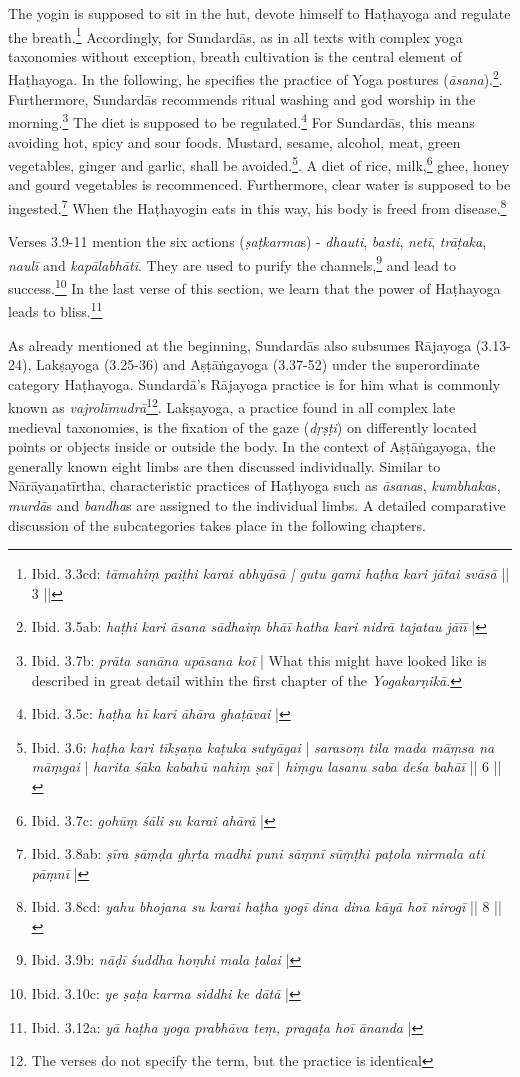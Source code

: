 The yogin is supposed to sit in the hut, devote himself to Haṭhayoga and regulate the breath.\footnote{Ibid. 3.3cd: \textit{tāmahiṃ paiṭhi karai abhyāsā | gutu gami haṭha kari jātai svāsā} || 3 ||} Accordingly, for Sundardās, as in all texts with complex yoga taxonomies without exception, breath cultivation is the central element of Haṭhayoga. In the following, he specifies the practice of Yoga postures (\textit{āsana}).\footnote{Ibid. 3.5ab: \textit{haṭhi kari āsana sādhaiṃ bhāī} \textit{hatha kari nidrā tajatau jāīī} |}. Furthermore, Sundardās recommends ritual washing and god worship in the morning.\footnote{Ibid. 3.7b: \textit{prāta sanāna upāsana koī} | What this might have looked like is described in great detail within the first chapter of the \textit{Yogakarṇikā}.} The diet is supposed to be regulated.\footnote{Ibid. 3.5c: \textit{haṭha hī kari āhāra ghaṭāvai} |} For Sundardās, this means avoiding hot, spicy and sour foods. Mustard, sesame, alcohol, meat, green vegetables, ginger and garlic, shall be avoided.\footnote{Ibid. 3.6: \textit{haṭha kari tīkṣaṇa kaṭuka sutyāgai} | \textit{sarasoṃ tila mada māṃsa na māṃgai} | \textit{harita śāka kabahū nahiṃ ṣaī} | \textit{hiṃgu lasanu saba deśa bahāī} || 6 ||}. A diet of rice, milk,\footnote{Ibid. 3.7c: \textit{gohūṃ śāli su karai ahārā} |} ghee, honey and gourd vegetables is recommenced. Furthermore, clear water is supposed to be ingested.\footnote{Ibid. 3.8ab: \textit{ṣīra ṣāṃḍa ghṛta madhi puni sāṃnī} \textit{sūṃṭhi paṭola nirmala ati pāṃnī} |} When the Haṭhayogin eats in this way, his body is freed from disease.\footnote{Ibid. 3.8cd: \textit{yahu bhojana su karai haṭha yogī} \textit{dina dina kāyā hoī nirogī} || 8 ||}

Verses 3.9-11 mention the six actions (\textit{ṣaṭkarma}s) - \textit{dhauti}, \textit{basti}, \textit{netī}, \textit{trāṭaka}, \textit{naulī} and \textit{kapālabhātī}. They are used to purify the channels,\footnote{Ibid. 3.9b: \textit{nāḍī śuddha hoṃhi mala ṭalai} |} and lead to success.\footnote{Ibid. 3.10c: \textit{ye ṣaṭa karma siddhi ke dātā} |} In the last verse of this section, we learn that the power of Haṭhayoga leads to bliss.\footnote{Ibid. 3.12a: \textit{yā haṭha yoga prabhāva teṃ, pragaṭa hoī ānanda} |}

As already mentioned at the beginning, Sundardās also subsumes Rājayoga (3.13-24), Lakṣayoga (3.25-36) and Aṣṭāṅgayoga (3.37-52) under the superordinate category Haṭhayoga. Sundardā's Rājayoga practice is for him what is commonly known as \textit{vajrolīmudrā}\footnote{The verses do not specify the term, but the practice is identical}. Lakṣayoga, a practice found in all complex late medieval taxonomies, is the fixation of the gaze (\textit{dṛṣṭi}) on differently located points or objects inside or outside the body. In the context of Aṣṭāṅgayoga, the generally known eight limbs are then discussed individually. Similar to Nārāyaṇatīrtha, characteristic practices of Haṭhyoga such as \textit{āsana}s, \textit{kumbhaka}s, \textit{murdā}s and \textit{bandha}s are assigned to the individual limbs. A detailed comparative discussion of the subcategories takes place in the following chapters.



